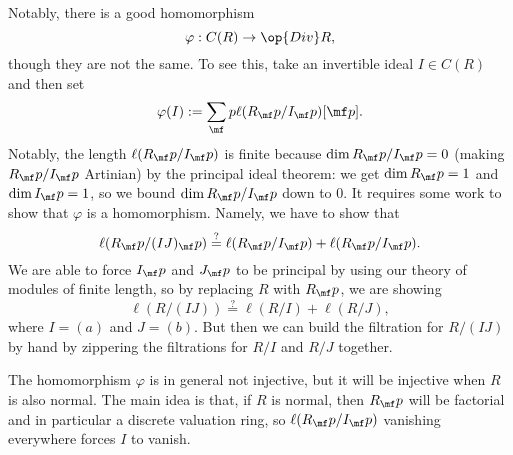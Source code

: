 Notably, there is a good homomorphism
\[\varphi:C(R)\to\op{Div}R,\]
though they are not the same. To see this, take an invertible ideal $I\in C(R)$ and then set
\[\varphi(I):=\sum_\mf p\ell(R_\mf p/I_\mf p)[\mf p].\]
Notably, the length $\ell(R_\mf p/I_\mf p)$ is finite because $\dim R_\mf p/I_\mf p=0$ (making $R_\mf p/I_\mf p$ Artinian) by the principal ideal theorem: we get $\dim R_\mf p=1$ and $\dim I_\mf p=1$, so we bound $\dim R_\mf p/I_\mf p$ down to $0$. It requires some work to show that $\varphi$ is a homomorphism. Namely, we have to show that
\[\ell(R_\mf p/(IJ)_\mf p)\stackrel?=\ell(R_\mf p/I_\mf p)+\ell(R_\mf p/I_\mf p).\]
We are able to force $I_\mf p$ and $J_\mf p$ to be principal by using our theory of modules of finite length, so by replacing $R$ with $R_\mf p$, we are showing
\[\ell(R/(IJ))\stackrel?=\ell(R/I)+\ell(R/J),\]
where $I=(a)$ and $J=(b)$. But then we can build the filtration for $R/(IJ)$ by hand by zippering the filtrations for $R/I$ and $R/J$ together.
\begin{remark}
	The homomorphism $\varphi$ is in general not injective, but it will be injective when $R$ is also normal. The main idea is that, if $R$ is normal, then $R_\mf p$ will be factorial and in particular a discrete valuation ring, so $\ell(R_\mf p/I_\mf p)$ vanishing everywhere forces $I$ to vanish.
\end{remark}